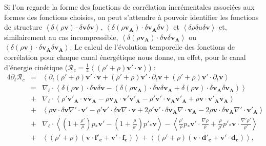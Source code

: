 Si l'on regarde la forme des fonctions de corrélation incrémentales associées aux formes des fonctions choisies, on peut s'attendre à pouvoir identifier les fonctions de structure $\left<\delta \left(\rho\boldsymbol{v}\right) \cdot \delta \boldsymbol{v} \delta \boldsymbol{v}\right>$, $\left<\delta \left(\rho\boldsymbol{v_A}\right) \cdot \delta \boldsymbol{v_A} \delta \boldsymbol{v}\right>$ et $\left<\delta \rho \delta u \delta \boldsymbol{v}\right>$ et, similairement au cas incompressible, $\left<\delta \left(\rho\boldsymbol{v_A}\right) \cdot \delta \boldsymbol{v} \delta \boldsymbol{v_A}\right>$ ou $\left<\delta \left(\rho\boldsymbol{v}\right) \cdot \delta \boldsymbol{v_A} \delta \boldsymbol{v_A}\right>$. Le calcul de l'évolution temporelle des fonctions de corrélation pour chaque canal énergétique nous donne, en effet, pour le canal d'énergie cinétique ($\mathcal{R}_{c} = \frac{1}{4}\left<\left(\rho'+\rho\right)\boldsymbol{v'} \cdot \boldsymbol{v}\right>$) :
\begin{eqnarray}
\label{eq:turb_cpi_Rc} 4\partial_t \mathcal{R}_{c} &=& \left<\partial_t \left(\rho'+\rho\right) \boldsymbol{v'} \cdot  \boldsymbol{v}  +  \left(\rho'+\rho \right) \boldsymbol{v'} \cdot  \partial_t \boldsymbol{v} +   \left(\rho'+\rho\right) \boldsymbol{v'} \cdot  \partial_t \boldsymbol{v} \right>\nonumber \\
&=&\nabla_{\boldsymbol{\ell}} \cdot \left<\delta \left(\rho\boldsymbol{v}\right) \cdot \delta \boldsymbol{v} \delta \boldsymbol{v} -\left(\delta \left(\rho\boldsymbol{v_A}\right) \cdot \delta \boldsymbol{v} \delta \boldsymbol{v_A} + \delta \left(\rho\boldsymbol{v}\right) \cdot \delta \boldsymbol{v_A} \delta \boldsymbol{v_A} \right)\right>\nonumber \\
&+& \nabla_{\boldsymbol{\ell}} \cdot \left<\rho' \boldsymbol{v'_A}\cdot  \boldsymbol{v} \boldsymbol{v_A} -\rho \boldsymbol{v_A}\cdot  \boldsymbol{v'} \boldsymbol{v'_A}-\rho' \boldsymbol{v'} \cdot\boldsymbol{v_A}\boldsymbol{v'_A} +  \rho  \boldsymbol{v} \cdot\boldsymbol{v'_A}\boldsymbol{v_A}\right> \nonumber\\
&+&\left< \rho \boldsymbol{v} \cdot \delta \boldsymbol{v} \nabla' \cdot \boldsymbol{v'} -\rho' \boldsymbol{v'} \cdot \delta \boldsymbol{v} \nabla \cdot \boldsymbol{v} +2 \rho' \boldsymbol{v'} \cdot \delta \boldsymbol{v_A}\nabla \cdot \boldsymbol{v_A} - 2\rho \boldsymbol{v} \cdot \delta \boldsymbol{v_A}\nabla' \cdot \boldsymbol{v'_A}\right> \nonumber\\
&+&  \nabla_{\boldsymbol{\ell}} \cdot \left< \left(1+\frac{\rho'}{\rho}\right)p_*  \boldsymbol{v'} -  \left(1+\frac{\rho}{\rho'}\right)p'_*  \boldsymbol{v} \right>- \left<\frac{\rho'}{\rho} p_*  \boldsymbol{v'} \cdot \frac{\nabla \rho}{\rho} + \frac{\rho}{\rho'} p'_*  \boldsymbol{v} \cdot \frac{\nabla' \rho'}{\rho'} \right>\nonumber\\
&+&  \left<\left(\rho' + \rho\right)\left(\boldsymbol{v} \cdot \boldsymbol{f'_c} + \boldsymbol{v'} \cdot \boldsymbol{f_c}\right) \right>+ \left<\left(\rho' + \rho\right)\left(\boldsymbol{v} \cdot \boldsymbol{d'_c} + \boldsymbol{v'} \cdot \boldsymbol{d_c}\right)\right> ,
\end{eqnarray}
